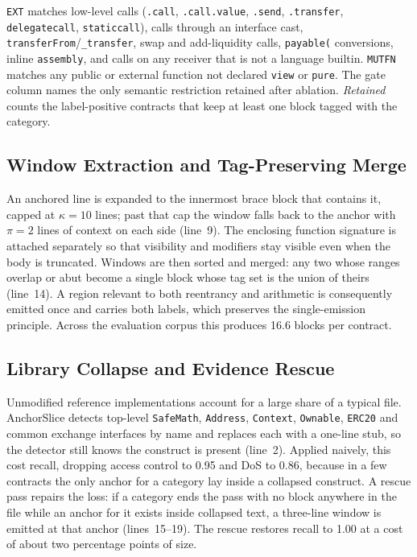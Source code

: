 \documentclass{ieeeaccess}
\begin{document}
\begin{table}[htbp]
\parbox{\linewidth}{\scriptsize \texttt{EXT} matches low-level calls (\texttt{.call}, \texttt{.call.value}, \texttt{.send}, \texttt{.transfer}, \texttt{delegatecall}, \texttt{staticcall}), calls through an interface cast, \texttt{transferFrom}/\texttt{\_transfer}, swap and add-liquidity calls, \texttt{payable(} conversions, inline \texttt{assembly}, and calls on any receiver that is not a language builtin. \texttt{MUTFN} matches any public or external function not declared \texttt{view} or \texttt{pure}. The gate column names the only semantic restriction retained after ablation. \emph{Retained} counts the label-positive contracts that keep at least one block tagged with the category.}
\end{table}

\subsection{Window Extraction and Tag-Preserving Merge}\label{subsec:merge}
An anchored line is expanded to the innermost brace block that contains it, capped at $\kappa = 10$ lines; past that cap the window falls back to the anchor with $\pi = 2$ lines of context on each side (line~9). The enclosing function signature is attached separately so that visibility and modifiers stay visible even when the body is truncated. Windows are then sorted and merged: any two whose ranges overlap or abut become a single block whose tag set is the union of theirs (line~14). A region relevant to both reentrancy and arithmetic is consequently emitted once and carries both labels, which preserves the single-emission principle. Across the evaluation corpus this produces 16.6 blocks per contract.

\subsection{Library Collapse and Evidence Rescue}\label{subsec:rescue}
Unmodified reference implementations account for a large share of a typical file. AnchorSlice detects top-level \texttt{SafeMath}, \texttt{Address}, \texttt{Context}, \texttt{Ownable}, \texttt{ERC20} and common exchange interfaces by name and replaces each with a one-line stub, so the detector still knows the construct is present (line~2). Applied naively, this cost recall, dropping access control to 0.95 and DoS to 0.86, because in a few contracts the only anchor for a category lay inside a collapsed construct. A rescue pass repairs the loss: if a category ends the pass with no block anywhere in the file while an anchor for it exists inside collapsed text, a three-line window is emitted at that anchor (lines~15--19). The rescue restores recall to 1.00 at a cost of about two percentage points of size.
\end{document}
